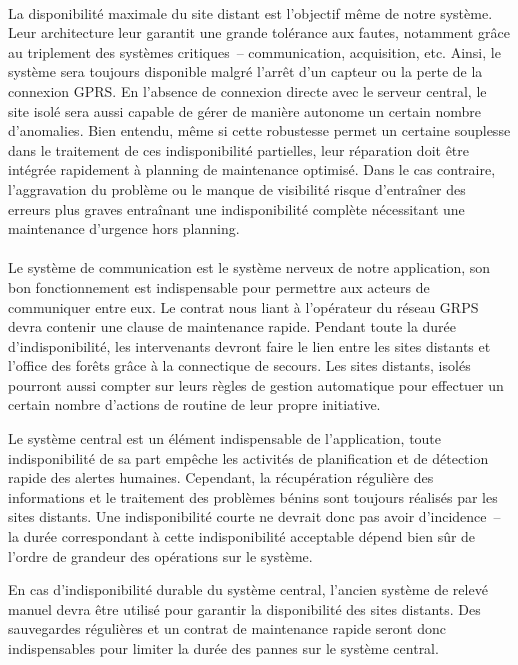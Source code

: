 \documentclass[a4paper, 11pt, final]{article}
\begin{document}
\paragraph{}
La disponibilité maximale du site distant est l'objectif même de notre
système. Leur architecture leur garantit une grande tolérance aux
fautes, notamment grâce au triplement des systèmes critiques~--
communication, acquisition, etc. Ainsi, le système sera
toujours disponible malgré l'arrêt d'un capteur ou la perte de la
connexion GPRS. En l'absence de connexion directe avec le serveur
central, le site isolé sera aussi capable de gérer de manière
autonome un certain nombre d'anomalies. Bien entendu, même si cette
robustesse permet un certaine souplesse dans le traitement de ces
indisponibilité partielles, leur réparation doit être intégrée
rapidement à planning de maintenance optimisé. Dans le cas contraire,
l'aggravation du problème ou le manque de visibilité risque
d'entraîner des erreurs plus graves entraînant une indisponibilité
complète nécessitant une maintenance d'urgence hors planning.



\paragraph{}

Le système de communication est le système nerveux de notre
application, son bon fonctionnement est indispensable pour permettre
aux acteurs de communiquer entre eux. Le contrat nous liant à
l'opérateur du réseau GRPS devra contenir une clause de maintenance
rapide.  Pendant toute la durée d'indisponibilité, les intervenants
devront faire le lien entre les sites distants et l'office des forêts
grâce à la connectique de secours. Les sites distants, isolés pourront
aussi compter sur leurs règles de gestion automatique pour effectuer
un certain nombre d'actions de routine de leur propre initiative.

Le système central est un élément indispensable de l'application,
toute indisponibilité de sa part empêche les activités de
planification et de détection rapide des alertes humaines. Cependant,
la récupération régulière des informations et le traitement des
problèmes bénins sont toujours réalisés par les sites distants. Une
indisponibilité courte ne devrait donc pas avoir d'incidence~-- la
durée correspondant à cette indisponibilité acceptable dépend bien sûr
de l'ordre de grandeur des opérations sur le système.

En cas d'indisponibilité durable du système central, l'ancien système
de relevé manuel devra être utilisé pour garantir la disponibilité des
sites distants. Des sauvegardes régulières et un contrat de
maintenance rapide seront donc indispensables pour limiter la durée
des pannes sur le système central.
\end{document}
